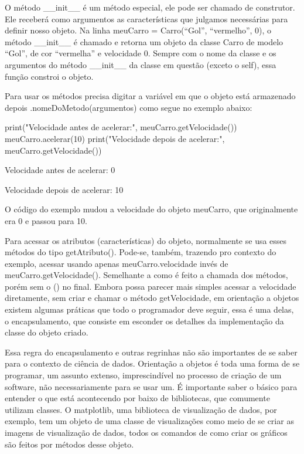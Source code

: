 \documentclass[
  letterpaper,
  DIV=11,
  numbers=noendperiod]{scrreprt}
\newenvironment{Shaded}{\begin{snugshade}}{\end{snugshade}}
\newcommand{\BuiltInTok}[1]{\textcolor[rgb]{0.00,0.23,0.31}{#1}}
\newcommand{\DecValTok}[1]{\textcolor[rgb]{0.68,0.00,0.00}{#1}}
\newcommand{\NormalTok}[1]{\textcolor[rgb]{0.00,0.23,0.31}{#1}}
\newcommand{\StringTok}[1]{\textcolor[rgb]{0.13,0.47,0.30}{#1}}
\begin{document}
O método \_\_init\_\_ é um método especial, ele pode ser chamado de
construtor. Ele receberá como argumentos as características que julgamos
necessárias para definir nosso objeto. Na linha meuCarro =
Carro(``Gol'', ``vermelho'', 0), o método \_\_init\_\_ é chamado e
retorna um objeto da classe Carro de modelo ``Gol'', de cor ``vermelha''
e velocidade 0. Sempre com o nome da classe e os argumentos do método
\_\_init\_\_ da classe em questão (exceto o self), essa função constroi
o objeto.

Para usar os métodos precisa digitar a variável em que o objeto está
armazenado depois .nomeDoMetodo(argumentos) como segue no exemplo
abaixo:

\begin{Shaded}
\begin{Highlighting}[]
\BuiltInTok{print}\NormalTok{(}\StringTok{"Velocidade antes de acelerar:"}\NormalTok{, meuCarro.getVelocidade()) }
\NormalTok{meuCarro.acelerar(}\DecValTok{10}\NormalTok{)}
\BuiltInTok{print}\NormalTok{(}\StringTok{"Velocidade depois de acelerar:"}\NormalTok{, meuCarro.getVelocidade())}
\end{Highlighting}
\end{Shaded}

\begin{tcolorbox}[enhanced jigsaw, breakable, leftrule=.75mm, left=2mm, opacityback=0, bottomrule=.15mm, toprule=.15mm, rightrule=.15mm, arc=.35mm, colback=white]

Velocidade antes de acelerar: 0

Velocidade depois de acelerar: 10

\end{tcolorbox}

O código do exemplo mudou a velocidade do objeto meuCarro, que
originalmente era 0 e passou para 10.

Para acessar os atributos (características) do objeto, normalmente se
usa esses métodos do tipo getAtributo(). Pode-se, também, trazendo pro
contexto do exemplo, acessar usando apenas meuCarro.velocidade invés de
meuCarro.getVelocidade(). Semelhante a como é feito a chamada dos
métodos, porém sem o () no final. Embora possa parecer mais simples
acessar a velocidade diretamente, sem criar e chamar o método
getVelocidade, em orientação a objetos existem algumas práticas que todo
o programador deve seguir, essa é uma delas, o encapsulamento, que
consiste em esconder os detalhes da implementação da classe do objeto
criado.

Essa regra do encapsulamento e outras regrinhas não são importantes de
se saber para o contexto de ciência de dados. Orientação a objetos é
toda uma forma de se programar, um assunto extenso, imprescindível no
processo de criação de um software, não necessariamente para se usar um.
É importante saber o básico para entender o que está acontecendo por
baixo de bibliotecas, que comumente utilizam classes. O matplotlib, uma
biblioteca de visualização de dados, por exemplo, tem um objeto de uma
classe de visualizações como meio de se criar as imagens de visualização
de dados, todos os comandos de como criar os gráficos são feitos por
métodos desse objeto.
\end{document}
